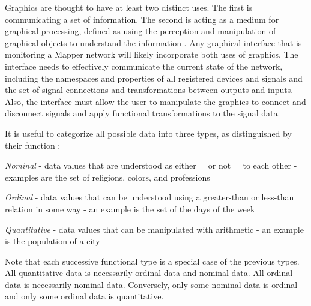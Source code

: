 Graphics are thought to have at least two distinct uses. The first is communicating a set of information. The second is acting as a medium for graphical processing, defined as using the perception and manipulation of graphical objects to understand the information \cite{card1997}. Any graphical interface that is monitoring a Mapper network will likely incorporate both uses of graphics. The interface needs to effectively communicate the current state of the network, including the namespaces and properties of all registered devices and signals and the set of signal connections and transformations between outputs and inputs. Also, the interface must allow the user to manipulate the graphics to connect and disconnect signals and apply functional transformations to the signal data.

It is useful to categorize all possible data into three types, as distinguished by their function \cite{semiology1983}\cite{card1997}:
\begin{description}
\item \emph{Nominal} - data values that are understood as either = or not = to each other - examples are the set of religions, colors, and professions
\item \emph{Ordinal} - data values that can be understood using a greater-than or less-than relation in some way - an example is the set of the days of the week
\item \emph{Quantitative} - data values that can be manipulated with arithmetic - an example is the population of a city 
\end{description}

Note that each successive functional type is a special case of the previous types. All quantitative data is necessarily ordinal data and nominal data. All ordinal data is necessarily nominal data. Conversely, only some nominal data is ordinal and only some ordinal data is quantitative.

